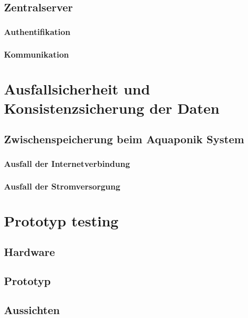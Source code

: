 \documentclass[12pt]{article}
\begin{document}
\subsection{Zentralserver}
\subsubsection{Authentifikation}
\subsubsection{Kommunikation}
%

\newpage %
\section{Ausfallsicherheit und Konsistenzsicherung der Daten}
%

\subsection{Zwischenspeicherung beim Aquaponik System}
%

\subsubsection{Ausfall der Internetverbindung}
%

\subsubsection{Ausfall der Stromversorgung}
%

\newpage %
\section{Prototyp testing}
\subsection{Hardware}
\subsection{Prototyp}
\subsection{Aussichten}
%
\end{document}
